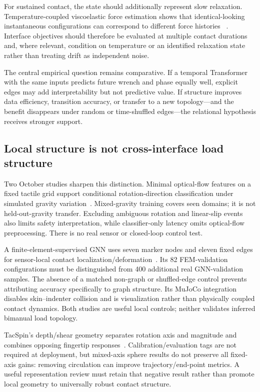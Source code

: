For sustained contact, the state should additionally represent slow relaxation.
Temperature-coupled viscoelastic force estimation shows that identical-looking
instantaneous configurations can correspond to different force histories
~\cite{wang2026relaxation}. Interface objectives should therefore be evaluated at
multiple contact durations and, where relevant, condition on temperature or an
identified relaxation state rather than treating drift as independent noise.

The central empirical question remains comparative. If a temporal Transformer
with the same inputs predicts future wrench and phase equally well, explicit
edges may add interpretability but not predictive value. If structure improves
data efficiency, transition accuracy, or transfer to a new topology---and the
benefit disappears under random or time-shuffled edges---the relational
hypothesis receives stronger support.

\subsection{Local structure is not cross-interface load structure}

Two October studies sharpen this distinction. Minimal optical-flow features on a
fixed tactile grid support conditional rotation-direction classification under
simulated gravity variation~\cite{martinezbernal2026minimalflow}. Mixed-gravity training
covers seen domains; it is not held-out-gravity transfer. Excluding ambiguous
rotation and linear-slip events also limits safety interpretation, while
classifier-only latency omits optical-flow preprocessing. There is no real
sensor or closed-loop control test.

A finite-element-supervised GNN uses seven marker nodes and eleven fixed edges
for sensor-local contact localization/deformation~\cite{terrile2026femtactile}.
Its 82 FEM-validation configurations must be distinguished from 400 additional
real GNN-validation samples. The absence of a matched non-graph or shuffled-edge
control prevents attributing accuracy specifically to graph structure. Its
MuJoCo integration disables skin--indenter collision and is visualization rather
than physically coupled contact dynamics. Both studies are useful local controls;
neither validates inferred bimanual load topology.

TacSpin's depth/shear geometry separates rotation axis and magnitude and combines
opposing fingertip responses~\cite{wu2026tacspin}. Calibration/evaluation tags
are not required at deployment, but mixed-axis sphere results do not preserve
all fixed-axis gains: removing circulation can improve trajectory/end-point
metrics. A useful representation review must retain that negative result rather
than promote local geometry to universally robust contact structure.

